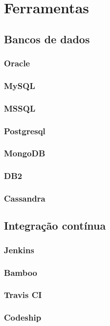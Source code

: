 \chapter{Ferramentas}

    \section{Bancos de dados}

	\subsection{Oracle}
	\subsection{MySQL}
	\subsection{MSSQL}
	\subsection{Postgresql}
	\subsection{MongoDB}
	\subsection{DB2}
	\subsection{Cassandra}

    \section{Integração contínua}

	\subsection{Jenkins}
	\subsection{Bamboo}
	\subsection{Travis CI}
	\subsection{Codeship}
